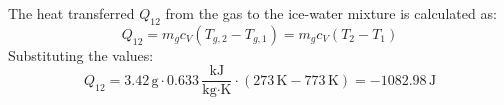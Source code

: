 The heat transferred \( Q_{12} \) from the gas to the ice-water mixture is calculated as:  
\[
Q_{12} = m_g c_V (T_{g,2} - T_{g,1}) = m_g c_V (T_2 - T_1)
\]  
Substituting the values:  
\[
Q_{12} = 3.42 \, \text{g} \cdot 0.633 \, \frac{\text{kJ}}{\text{kg·K}} \cdot (273 \, \text{K} - 773 \, \text{K}) = -1082.98 \, \text{J}
\]